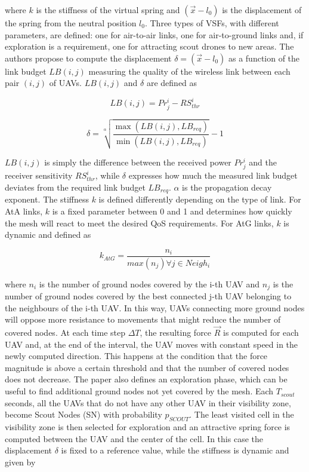 where $k$ is the stiffness of the virtual spring and $(\overrightarrow{x} - l_0)$ is the displacement of the spring from the neutral position $l_0$. Three types of \glspl{VSF}, with different parameters, are defined: one for air-to-air links, one for air-to-ground links and, if exploration is a requirement, one for attracting scout drones to new areas. The authors propose to compute the displacement $\delta = (\overrightarrow{x} - l_0)$ as a function of the link budget $LB(i,j)$ measuring the quality of the wireless link between each pair $(i,j)$ of \glspl{UAV}. $LB(i,j)$ and $\delta$ are defined as

\begin{equation}
	LB(i,j) = Pr^i_j - RS^i_{thr}
\end{equation}  

\begin{equation}
	\delta = \sqrt[\alpha]{\frac{\max(LB(i,j), LB_{req})}{\min(LB(i,j), LB_{req})}} - 1
\end{equation}

$LB(i,j)$ is simply the difference between the received power $Pr^i_j$ and the receiver sensitivity $RS^i_{thr}$, while $\delta$ expresses how much the measured link budget deviates from the required link budget $LB_{req}$. $\alpha$ is the propagation decay exponent. The stiffness $k$ is defined differently depending on the type of link. For AtA links, $k$ is a fixed parameter between 0 and 1 and determines how quickly the mesh will react to meet the desired QoS requirements. For AtG links, $k$ is dynamic and defined as

\begin{equation}
	k_{AtG} = \frac{n_i}{max(n_j)\forall j \in Neigh_i}
\end{equation}

where $n_i$ is the number of ground nodes covered by the i-th \gls{UAV} and $n_j$ is the number of ground nodes covered by the best connected j-th \gls{UAV} belonging to the neighbours of the i-th \gls{UAV}. In this way, \glspl{UAV} connecting more ground nodes will oppose more resistance to movements that might reduce the number of covered nodes. At each time step $\Delta T$, the resulting force $\overrightarrow{R}$ is computed for each \gls{UAV} and, at the end of the interval, the \gls{UAV} moves with constant speed in the newly computed direction. This happens at the condition that the force magnitude is above a certain threshold and that the number of covered nodes does not decrease. The paper also defines an exploration phase, which can be useful to find additional ground nodes not yet covered by the mesh. Each $T_{scout}$ seconds, all the \glspl{UAV} that do not have any other \gls{UAV} in their visibility zone, become Scout Nodes (SN) with probability $p_{SCOUT}$. The least visited cell in the visibility zone is then selected for exploration and an attractive spring force is computed between the \gls{UAV} and the center of the cell. In this case the displacement $\delta$ is fixed to a reference value, while the stiffness is dynamic and given by


